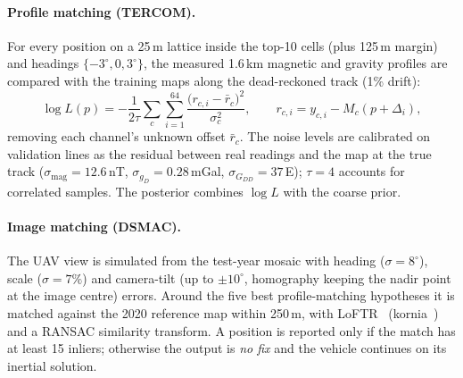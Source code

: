 \documentclass[11pt,a4paper]{article}
\begin{document}
\paragraph{Profile matching (TERCOM).} For every position on a 25\,m lattice inside the top-10 cells
(plus 125\,m margin) and headings $\{-3^\circ,0,3^\circ\}$, the measured 1.6\,km magnetic and gravity
profiles are compared with the training maps along the dead-reckoned track (1\% drift):
\begin{equation}
\log L(p) = -\frac{1}{2\tau}\sum_{c}\sum_{i=1}^{64}\frac{\big(r_{c,i}-\bar r_c\big)^2}{\sigma_c^2},\qquad
r_{c,i}=y_{c,i}-M_c(p+\Delta_i),
\end{equation}
removing each channel's unknown offset $\bar r_c$. The noise levels are calibrated on validation lines
as the residual between real readings and the map at the true track ($\sigma_\text{mag}=12.6$\,nT,
$\sigma_{g_D}=0.28$\,mGal, $\sigma_{G_{DD}}=37$\,E); $\tau=4$ accounts for correlated samples. The
posterior combines $\log L$ with the coarse prior.

\paragraph{Image matching (DSMAC).} The UAV view is simulated from the test-year mosaic with heading
($\sigma=8^\circ$), scale ($\sigma=7\%$) and camera-tilt (up to $\pm10^\circ$, homography keeping the
nadir point at the image centre) errors. Around the five best profile-matching hypotheses it is matched
against the 2020 reference map within 250\,m, with LoFTR~\cite{sun2021loftr} (kornia~\cite{riba2020kornia})
and a RANSAC similarity transform. A position is reported only if the match has at least 15 inliers;
otherwise the output is \emph{no fix} and the vehicle continues on its inertial solution.

\end{document}
